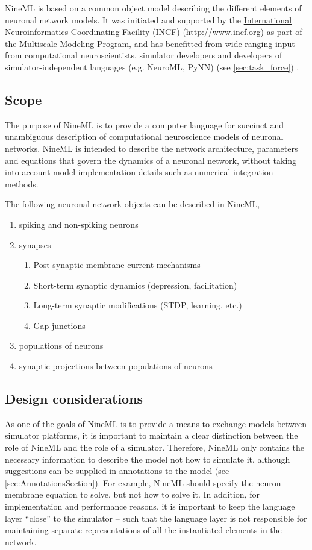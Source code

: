 \documentclass[draftspec]{ninemlspec}
\begin{document}
NineML is based on a
common object model describing the different elements of neuronal network
models. It was initiated and supported by the \href{http://www.incf.org}{International
Neuroinformatics Coordinating Facility (INCF) (http://www.incf.org)} as part of the \href{https://www.incf.org/activities/our-programs/modeling/people}{Multiscale Modeling Program}, and has benefitted from wide-ranging input from computational neuroscientists,
simulator developers and developers of simulator-independent languages (e.g. NeuroML, PyNN) (see \ref{sec:task_force}) \citep{Goddard2001, Davison2008}.

\subsection{Scope}
\label{sec:scope}

The purpose of NineML is to provide a computer language for
succinct and unambiguous description of computational neuroscience models of neuronal networks.
NineML is intended to describe the network architecture, parameters
and equations that govern the dynamics of a neuronal network, without
taking into account model implementation details such as numerical integration
methods.

The following neuronal network objects can be described in NineML,
\begin{enumerate}
\item spiking and non-spiking neurons
\item synapses
\begin{enumerate}
\item Post-synaptic membrane current mechanisms
\item Short-term synaptic dynamics (depression, facilitation)
\item Long-term synaptic modifications (STDP, learning, etc.)
\item Gap-junctions
\end{enumerate}
\item populations of neurons
\item synaptic projections between populations of neurons
\end{enumerate}

\subsection{Design considerations}
\label{sec:design_considerations}

As one of the goals of NineML is to provide a means to exchange models between simulator platforms, 
it is important to maintain a clear distinction
between the role of NineML and the role of a simulator. Therefore, NineML only
contains the necessary information to describe the model
not how to simulate it, although suggestions can be supplied in annotations to the model (see \ref{sec:AnnotationsSection}). 
For example, NineML should specify the neuron membrane equation to solve,
but not how to solve it.  In addition, for implementation and performance
reasons, it is important to keep the language layer ``close'' to the simulator
-- such that the language layer is not responsible for maintaining separate
representations of all the instantiated elements in the network.
\end{document}
